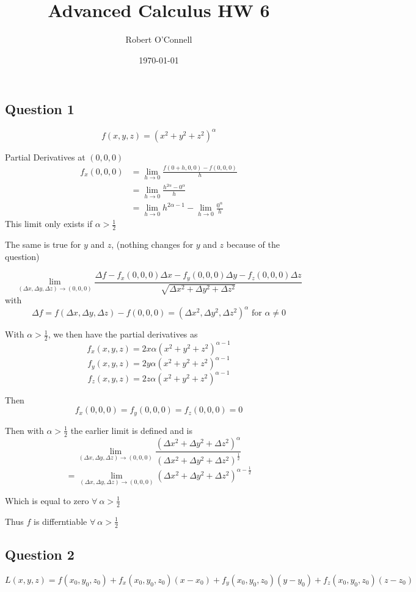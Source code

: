 \documentclass{article}
\title{\textbf{Advanced Calculus HW 6}}
\author{Robert O'Connell}
\date{\today}
\begin{document}
\maketitle
\vspace{5mm}

\subsection*{Question 1}
\[
f(x,y,z) = (x^2 + y^2 +z^2)^\alpha
\]

Partial Derivatives at \((0,0,0)\)
\begin{align*}
    f_x(0,0,0) &= \lim_{h\to 0}{\frac{f(0+h,0,0)- f(0,0,0)}{h}} \\
    &= \lim_{h\to 0}{\frac{h^{2\alpha} - 0^\alpha}{h}} \\
    &= \lim_{h\to 0}{h^{2\alpha -1}} - \lim_{h\to 0}{\frac{0^\alpha}{h}}
\end{align*}
This limit only exists if \(\alpha > \frac{1}{2}\)

The same is true for \(y\) and \(z\), (nothing changes for \(y\) and \(z\) because of the question)

\[
\lim_{(\Delta x, \Delta y, \Delta z)\to (0,0,0)}{\frac{\Delta f - f_x(0,0,0)\Delta x - f_y(0,0,0)\Delta y - f_z(0,0,0)\Delta z}{\sqrt{\Delta x ^2 + \Delta y^2 + \Delta z^2}}}
\]
with
\[
\Delta f = f(\Delta x , \Delta y, \Delta z) - f(0,0,0) = (\Delta x^2, \Delta y^2, \Delta z^2)^\alpha \text{ for } \alpha \neq 0
\]

With \(\alpha > \frac{1}{2}\), we then have the partial derivatives as 
\[
f_x(x,y,z) = 2x\alpha(x^2 + y^2 + z^2)^{\alpha -1}
\]
\[
f_y(x,y,z) = 2y\alpha(x^2 + y^2 + z^2)^{\alpha -1}
\]
\[
f_z(x,y,z) = 2z\alpha(x^2 + y^2 + z^2)^{\alpha -1}
\]

Then
\[
f_x(0,0,0) = f_y(0,0,0) = f_z(0,0,0) = 0
\]

Then with \(\alpha > \frac{1}{2}\) the earlier limit is defined and is 
\[
\lim_{(\Delta x, \Delta y, \Delta z)\to (0,0,0)}{\frac{(\Delta x^2 + \Delta y^2 + \Delta z^2)^\alpha}{(\Delta x ^2 + \Delta y^2 + \Delta z^2)^{\frac{1}{2}}}}
\]
\[
= \lim_{(\Delta x, \Delta y, \Delta z)\to (0,0,0)}{(\Delta x^2 + \Delta y^2 + \Delta z^2)^{\alpha - \frac{1}{2}}}
\]

Which is equal to zero \(\forall \ \alpha > \frac{1}{2}\)

Thus \(f\) is differntiable \(\forall \ \alpha > \frac{1}{2}\)

\subsection*{Question 2}
\[
L(x,y,z) = f(x_0,y_0,z_0) + f_x(x_0,y_0,z_0)(x-x_0) + f_y(x_0,y_0,z_0)(y-y_0) + f_z(x_0,y_0,z_0)(z-z_0)
\]
\end{document}
